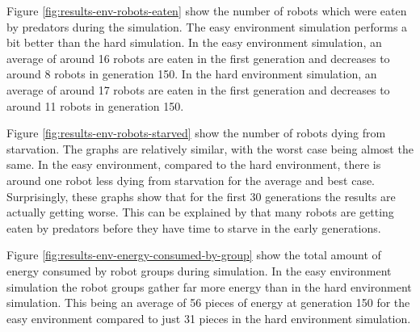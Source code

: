 Figure \ref{fig:results-env-robots-eaten} show the number of robots which were eaten by predators during the simulation.
The easy environment simulation performs a bit better than the hard simulation.
In the easy environment simulation, an average of around 16 robots are eaten in the first generation and decreases to around 8 robots in generation 150.
In the hard environment simulation, an average of around 17 robots are eaten in the first generation and decreases to around 11 robots in generation 150.

\vspace*{\fill}
\newpage
\vspace*{\fill}


Figure \ref{fig:results-env-robots-starved} show the number of robots dying from starvation.
The graphs are relatively similar, with the worst case being almost the same.
In the easy environment, compared to the hard environment, there is around one robot less dying from starvation for the average and best case.
Surprisingly, these graphs show that for the first 30 generations the results are actually getting worse.
This can be explained by that many robots are getting eaten by predators before they have time to starve in the early generations.  

\vspace*{\fill}
\newpage
\vspace*{\fill}


Figure \ref{fig:results-env-energy-consumed-by-group} show the total amount of energy consumed by robot groups during simulation.
In the easy environment simulation the robot groups gather far more energy than in the hard environment simulation.
This being an average of 56 pieces of energy at generation 150 for the easy environment compared to just 31 pieces in the hard environment simulation.

\vspace*{\fill}
\newpage
\vspace*{\fill}

